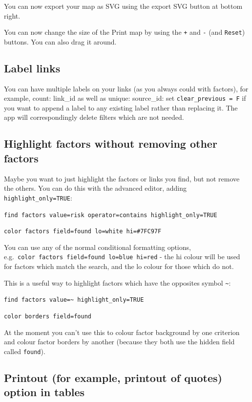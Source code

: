 \documentclass[
]{book}
\begin{document}
You can now export your map as SVG using the export SVG button at bottom right.

You can now change the size of the Print map by using the \texttt{+} and \texttt{-} (and \texttt{Reset}) buttons. You can also drag it around.

\hypertarget{label-links}{%
\subsection{Label links}\label{label-links}}

You can have multiple labels on your links (as you always could with factors), for example, count: link\_id as well as unique: source\_id: set \texttt{clear\_previous\ =\ F} if you want to append a label to any existing label rather than replacing it. The app will correspondingly delete filters which are not needed.

\hypertarget{highlight-factors-without-removing-other-factors}{%
\subsection{Highlight factors without removing other factors}\label{highlight-factors-without-removing-other-factors}}

Maybe you want to just highlight the factors or links you find, but not remove the others. You can do this with the advanced editor, adding \texttt{highlight\_only=TRUE}:

\texttt{find\ factors\ value=risk\ operator=contains\ highlight\_only=TRUE}

\texttt{color\ factors\ field=found\ lo=white\ hi=\#7FC97F}

You can use any of the normal conditional formatting options, e.g.~\texttt{color\ factors\ field=found\ lo=blue\ hi=red} - the hi colour will be used for factors which match the search, and the lo colour for those which do not.

This is a useful way to highlight factors which have the opposites symbol \texttt{\textasciitilde{}}:

\texttt{find\ factors\ value=\textasciitilde{}\ highlight\_only=TRUE}

\texttt{color\ borders\ field=found}

At the moment you can't use this to colour factor background by one criterion and colour factor borders by another (because they both use the hidden field called \texttt{found}).

\hypertarget{printout-for-example-printout-of-quotes-option-in-tables}{%
\subsection{Printout (for example, printout of quotes) option in tables}\label{printout-for-example-printout-of-quotes-option-in-tables}}
\end{document}
